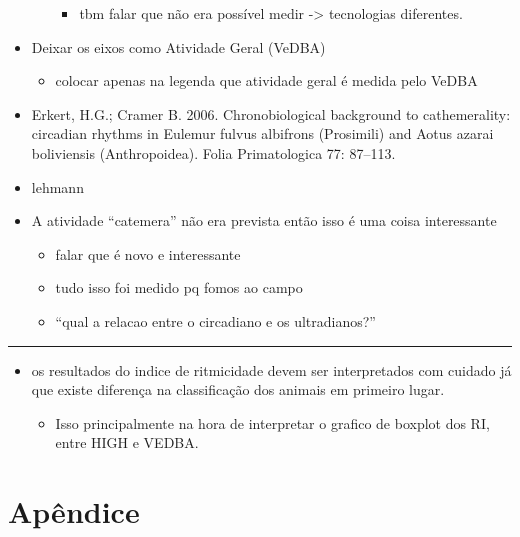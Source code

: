 \documentclass[english,msc,numbers,hidelinks]{coppe}
\providecommand{\tightlist}{%
  \setlength{\itemsep}{0pt}\setlength{\parskip}{0pt}}
\begin{document}
\begin{itemize}
\begin{itemize}
\begin{itemize}
      \item
        tbm falar que não era possível medir -\textgreater{} tecnologias diferentes.
      \end{itemize}
    \end{itemize}
  \item
    Deixar os eixos como Atividade Geral (VeDBA)
    \begin{itemize}
    \tightlist
    \item
      colocar apenas na legenda que atividade geral é medida pelo VeDBA
    \end{itemize}
  \item
    Erkert, H.G.; Cramer B. 2006. Chronobiological background to cathemerality: circadian rhythms in Eulemur fulvus albifrons (Prosimili) and Aotus azarai boliviensis (Anthropoidea). Folia Primatologica 77: 87--113.
  \item
    lehmann
  \item
    A atividade ``catemera'' não era prevista então isso é uma coisa interessante
    \begin{itemize}
    \tightlist
    \item
      falar que é novo e interessante
    \item
      tudo isso foi medido pq fomos ao campo
    \item
      ``qual a relacao entre o circadiano e os ultradianos?''
    \end{itemize}
  \end{itemize}
  \begin{center}\rule{0.5\linewidth}{0.5pt}\end{center}
  \begin{itemize}
  \item
    os resultados do indice de ritmicidade devem ser interpretados com cuidado já que existe diferença na classificação dos animais em primeiro lugar.
    \begin{itemize}
    \tightlist
    \item
      Isso principalmente na hora de interpretar o grafico de boxplot dos RI, entre HIGH e VEDBA.
    \end{itemize}
  \end{itemize}
  \appendix

  \hypertarget{apuxeandice}{%
  \chapter*{Apêndice}\label{apuxeandice}}
\end{document}
